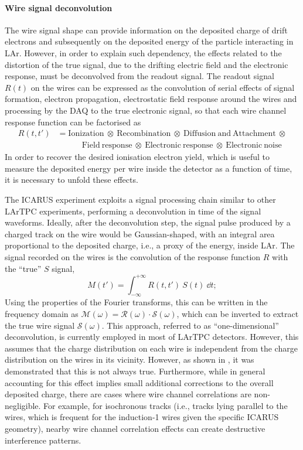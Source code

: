 \paragraph{Wire signal deconvolution} The wire signal shape can provide information on the deposited charge of drift electrons and subsequently on the deposited energy of the particle interacting in LAr. However, in order to explain such dependency, the effects related to the distortion of the true signal, due to the drifting electric field and the electronic response, must be deconvolved from the readout signal. The readout signal $R(t)$ on the wires can be expressed as the convolution of serial effects of signal formation, electron propagation, electrostatic field response around the wires and processing by the DAQ to the true electronic signal, so that each wire channel response function can be factorised as \begin{equation}
    \begin{aligned}
        R(t, t')&=\mathrm{Ionization\ \otimes\ Recombination\ \otimes\ Diffusion\ and\ Attachment\ \otimes} \\
        &\quad \quad \quad \mathrm{Field\ response\ \otimes\ Electronic\ response\ \otimes\ Electronic\ noise}
    \end{aligned} 
\end{equation} In order to recover the desired ionisation electron yield, which is useful to measure the deposited energy per wire inside the detector as a function of time, it is necessary to unfold these effects. 

The ICARUS experiment exploits a signal processing chain similar to other LArTPC experiments, performing a deconvolution in time of the signal waveforms. Ideally, after the deconvolution step, the signal pulse produced by a charged track on the wire would be Gaussian-shaped, with an integral area proportional to the deposited charge, i.e., a proxy of the energy, inside LAr. The signal recorded on the wires is the convolution of the response function $R$ with the ``true'' $S$ signal, \begin{equation}
    M(t') = \int_{-\infty}^{+\infty} R(t,t')\ S(t)\ \dd t;
\end{equation} Using the properties of the Fourier transforms, this can be written in the frequency domain as $\mathcal M(\omega) = \mathcal R(\omega)\cdot \mathcal S(\omega)$, which can be inverted to extract the true wire signal $\mathcal S(\omega)$. This approach, referred to as ``one-dimensional'' deconvolution, is currently employed in most of LArTPC detectors. However, this assumes that the charge distribution on each wire is independent from the charge distribution on the wires in its vicinity. However, as shown in \cite{MicroBooNE:2018swd,MicroBooNE:2018vro}, it was demonstrated that this is not always true. Furthermore, while in general accounting for this effect implies small additional corrections to the overall deposited charge, there are cases where wire channel correlations are non-negligible. For example, for isochronous tracks (i.e., tracks lying parallel to the wires, which is frequent for the induction-1 wires given the specific ICARUS geometry), nearby wire channel correlation effects can create destructive interference patterns.

